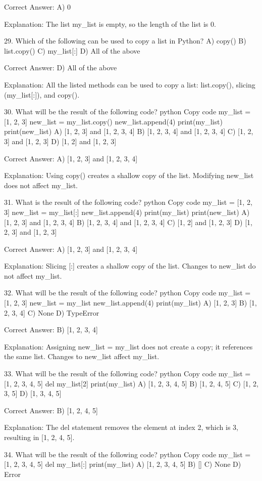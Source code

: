 Correct Answer: A) 0

Explanation:
The list my_list is empty, so the length of the list is 0.

29. Which of the following can be used to copy a list in Python?
A) copy()
B) list.copy()
C) my_list[:]
D) All of the above

Correct Answer: D) All of the above

Explanation:
All the listed methods can be used to copy a list: list.copy(), slicing (my_list[:]), and copy().

30. What will be the result of the following code?
python
Copy code
my_list = [1, 2, 3]
new_list = my_list.copy()
new_list.append(4)
print(my_list)
print(new_list)
A) [1, 2, 3] and [1, 2, 3, 4]
B) [1, 2, 3, 4] and [1, 2, 3, 4]
C) [1, 2, 3] and [1, 2, 3]
D) [1, 2] and [1, 2, 3]

Correct Answer: A) [1, 2, 3] and [1, 2, 3, 4]

Explanation:
Using copy() creates a shallow copy of the list. Modifying new_list does not affect my_list.

31. What is the result of the following code?
python
Copy code
my_list = [1, 2, 3]
new_list = my_list[:]
new_list.append(4)
print(my_list)
print(new_list)
A) [1, 2, 3] and [1, 2, 3, 4]
B) [1, 2, 3, 4] and [1, 2, 3, 4]
C) [1, 2] and [1, 2, 3]
D) [1, 2, 3] and [1, 2, 3]

Correct Answer: A) [1, 2, 3] and [1, 2, 3, 4]

Explanation:
Slicing [:] creates a shallow copy of the list. Changes to new_list do not affect my_list.

32. What will be the result of the following code?
python
Copy code
my_list = [1, 2, 3]
new_list = my_list
new_list.append(4)
print(my_list)
A) [1, 2, 3]
B) [1, 2, 3, 4]
C) None
D) TypeError

Correct Answer: B) [1, 2, 3, 4]

Explanation:
Assigning new_list = my_list does not create a copy; it references the same list. Changes to new_list affect my_list.

33. What will be the result of the following code?
python
Copy code
my_list = [1, 2, 3, 4, 5]
del my_list[2]
print(my_list)
A) [1, 2, 3, 4, 5]
B) [1, 2, 4, 5]
C) [1, 2, 3, 5]
D) [1, 3, 4, 5]

Correct Answer: B) [1, 2, 4, 5]

Explanation:
The del statement removes the element at index 2, which is 3, resulting in [1, 2, 4, 5].

34. What will be the result of the following code?
python
Copy code
my_list = [1, 2, 3, 4, 5]
del my_list[:]
print(my_list)
A) [1, 2, 3, 4, 5]
B) []
C) None
D) Error

